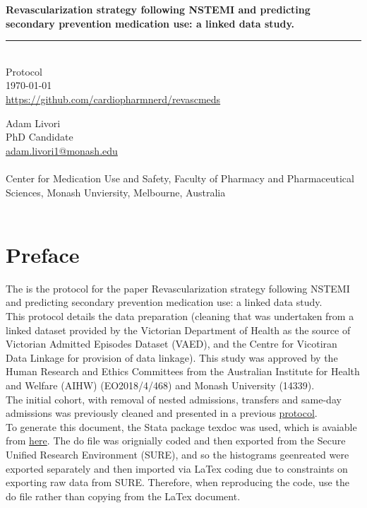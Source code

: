 \documentclass[11pt]{article}
\newcommand{\thedate}{\today}
\begin{document}
\begin{titlepage}
  \begin{flushright}
        \Huge
		\textbf{Revascularization strategy following NSTEMI and predicting secondary prevention medication use: a linked data study.}
\color{violet}
\rule{16cm}{2mm} \\
\Large
\color{black}
Protocol \\
\thedate \\
\color{blue}
\url{https://github.com/cardiopharmnerd/revascmeds} \\
\color{black}
		\vfill
	\end{flushright}
		\Large
\noindent
Adam Livori \\
PhD Candidate \\
\color{blue}
\href{mailto:adam.livori1@monash.edu}{adam.livori1@monash.edu} \\
\color{black}
\\
Center for Medication Use and Safety, Faculty of Pharmacy and Pharmaceutical Sciences, Monash Unviersity, Melbourne, Australia \\
\\
\end{titlepage}

\pagebreak
\tableofcontents
\pagebreak
\listoffigures
\pagebreak

\pagebreak
\section{Preface}

The is the protocol for the paper Revascularization strategy following NSTEMI and predicting secondary prevention medication use: a linked data study. \\
This protocol details the data preparation (cleaning that was undertaken from a linked dataset provided by the Victorian Department of Health as the source of Victorian Admitted Episodes Dataset (VAED), and the Centre for Vicotiran Data Linkage for provision of data linkage). This study was approved by the Human Research and Ethics Committees from the Australian Institute for Health and Welfare (AIHW) (EO2018/4/468) and Monash University (14339). \\
The initial cohort, with removal of nested admissions, transfers and same-day admissions was previously cleaned and presented in a previous \color{blue} \href{https://github.com/cardiopharmnerd/medsremote}{protocol}.\\
\color{black} To generate this document, the Stata package texdoc was used, which is avaiable from \color{blue} \href{http://repec.sowi.unibe.ch/stata/texdoc/}{here}. \color{black} The do file was orignially coded and then exported from the Secure Unified Research Environment (SURE), and so the histograms geenreated were exported separately and then imported via LaTex coding due to constraints on exporting raw data from SURE. Therefore, when reproducing the code, use the do file rather than copying from the LaTex document. 
\end{document}
